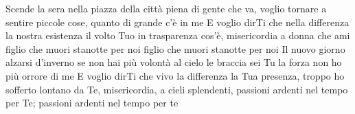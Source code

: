 \beginverse
Scende la sera nella piazza della città
piena di gente che va,
voglio tornare a sentire piccole cose,
quanto di grande c'è in me
\endverse
\beginchorus
E voglio dirTi che
nella differenza la nostra esistenza
il volto Tuo in trasparenza cos'è,
misericordia a donna che ami
figlio che muori stanotte per noi
figlio che muori stanotte per noi
\endchorus
\beginverse
Il nuovo giorno alzarsi d'inverno
se non hai più volontà
al cielo le braccia sei Tu la forza
non ho più orrore di me
\endverse
\beginchorus
E voglio dirTi che
vivo la differenza la Tua presenza,
troppo ho sofferto lontano da Te,
misericordia, a cieli splendenti,
passioni ardenti nel tempo per Te;
passioni ardenti nel tempo per te
\endchorus
\endsong
